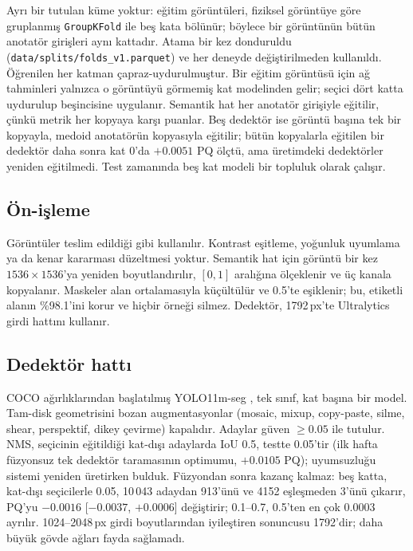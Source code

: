\documentclass[sigconf]{acmart}
\begin{document}
Ayrı bir tutulan küme yoktur: eğitim görüntüleri, fiziksel görüntüye göre gruplanmış \texttt{GroupKFold} ile beş kata bölünür; böylece bir görüntünün bütün anotatör girişleri aynı kattadır. Atama bir kez donduruldu (\texttt{data/splits/folds\_v1.parquet}) ve her deneyde değiştirilmeden kullanıldı. Öğrenilen her katman çapraz-uydurulmuştur. Bir eğitim görüntüsü için ağ tahminleri yalnızca o görüntüyü görmemiş kat modelinden gelir; seçici dört katta uydurulup beşincisine uygulanır. Semantik hat her anotatör girişiyle eğitilir, çünkü metrik her kopyaya karşı puanlar. Beş dedektör ise görüntü başına tek bir kopyayla, medoid anotatörün kopyasıyla eğitilir; bütün kopyalarla eğitilen bir dedektör daha sonra kat 0'da $+0.0051$ PQ ölçtü, ama üretimdeki dedektörler yeniden eğitilmedi. Test zamanında beş kat modeli bir topluluk olarak çalışır.

\subsection{Ön-işleme}
Görüntüler teslim edildiği gibi kullanılır. Kontrast eşitleme, yoğunluk uyumlama ya da kenar kararması düzeltmesi yoktur. Semantik hat için görüntü bir kez $1536\times1536$'ya yeniden boyutlandırılır, $[0,1]$ aralığına ölçeklenir ve üç kanala kopyalanır. Maskeler alan ortalamasıyla küçültülür ve 0.5'te eşiklenir; bu, etiketli alanın \%98.1'ini korur ve hiçbir örneği silmez. Dedektör, 1792\,px'te Ultralytics girdi hattını kullanır.

\subsection{Dedektör hattı}
COCO ağırlıklarından \cite{lin2014coco} başlatılmış YOLO11m-seg \cite{yolo11}, tek sınıf, kat başına bir model. Tam-disk geometrisini bozan augmentasyonlar (mosaic, mixup, copy-paste, silme, shear, perspektif, dikey çevirme) kapalıdır. Adaylar güven $\geq 0.05$ ile tutulur. NMS, seçicinin eğitildiği kat-dışı adaylarda IoU 0.5, testte 0.05'tir (ilk hafta füzyonsuz tek dedektör taramasının optimumu, $+0.0105$ PQ); uyumsuzluğu sistemi yeniden üretirken bulduk. Füzyondan sonra kazanç kalmaz: beş katta, kat-dışı seçicilerle 0.05, 10\,043 adaydan 913'ünü ve 4152 eşleşmeden 3'ünü çıkarır, PQ'yu $-0.0016$ [$-0.0037$, $+0.0006$] değiştirir; 0.1--0.7, 0.5'ten en çok 0.0003 ayrılır. 1024--2048\,px girdi boyutlarından iyileştiren sonuncusu 1792'dir; daha büyük gövde ağları fayda sağlamadı.
\end{document}
